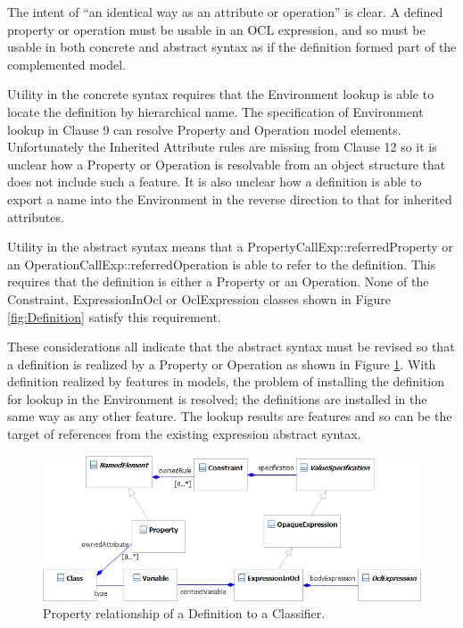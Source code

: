 \documentclass{eceasst}
\begin{document}
The intent of ``an identical way as an attribute or operation'' is clear. A defined property or operation must be usable in an OCL expression, and so must be usable in both concrete and abstract syntax as if the definition formed part of the complemented model.

Utility in the concrete syntax requires that the Environment lookup is able to locate the definition by hierarchical name. The specification of Environment lookup in Clause 9 can resolve Property and Operation model elements. Unfortunately the Inherited Attribute rules are missing from Clause 12 so it is unclear how a Property or Operation is resolvable from an object structure that does not include such a feature. It is also unclear how a definition is able to export a name into the Environment in the reverse direction to that for inherited attributes.

Utility in the abstract syntax means that a PropertyCallExp::referredProperty or an OperationCallExp::referredOperation is able to refer to the definition. This requires that the definition is either a Property or an Operation. None of the Constraint, ExpressionInOcl or OclExpression classes shown in Figure \ref{fig:Definition} satisfy this requirement.

These considerations all indicate that the abstract syntax must be revised so that a definition is realized by a Property or Operation as shown in Figure \ref{fig:PropertyDefinition}. With definition realized by features in models, the problem of installing the definition for lookup in the Environment is resolved; the definitions are installed in the same way as any other feature. The lookup results are features and so can be the target of references from the existing expression abstract syntax.

\begin{figure}
  \begin{center}
    \includegraphics[width=5.75in]{PropertyDefinition.png}
  \end{center}
  \caption{Property relationship of a Definition to a Classifier.}
  \label{fig:PropertyDefinition}
\end{figure}
\end{document}

